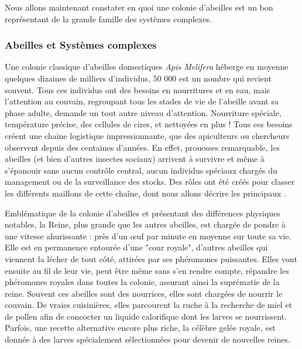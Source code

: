 			Nous allons maintenant constater en quoi une colonie d'abeilles est un bon représentant de la grande famille des systèmes complexes.
			
			

	
		\subsubsection{Abeilles et Systèmes complexes}		
			Une colonie classique d'abeilles domestiques \textit{Apis Melifera} héberge en moyenne quelques dizaines de milliers d'individus, 50 000 est un nombre qui revient souvent. Tous ces individus ont des besoins en nourritures et en eau, mais l'attention au couvain, regroupant tous les stades de vie de l'abeille avant sa phase adulte, demande un tout autre niveau d'attention. Nourriture spéciale, température précise, des cellules de cires, et nettoyées en plus ! Tous ces besoins créent une chaine logistique impressionnante, que des apiculteurs ou chercheurs observent depuis des centaines d'années. En effet, prouesses remarquable, les abeilles (et bien d'autres insectes sociaux) arrivent à survivre et même à s'épanouir sans aucun contrôle central, aucun individus spéciaux chargés du management ou de la surveillance des stocks. Des rôles ont été créés pour classer les différents maillons de cette chaîne, dont nous allons décrire les principaux \cite{winston_biology_1991, winston_role_1991, seeley_age_1991}. 
			
			Emblématique de la colonie d'abeilles et présentant des différences physiques notables, la Reine, plus grande que les autres abeilles, est chargée de pondre à une vitesse ahurissante : près d'un œuf par minute en moyenne sur toute sa vie. Elle est en permanence entourée d'une "cour royale", d'autres abeilles qui viennent la lécher de tout côté, attirées par ses phéromones puissantes. Elles vont ensuite au fil de leur vie, peut être même sans s'en rendre compte, répandre les phéromones royales dans toutes la colonie, assurant ainsi la suprématie de la reine. Souvent ces abeilles sont des nourrices, elles sont chargées de nourrir le couvain. De vraies cuisinières, elles parcourent la ruche à la recherche de miel et de pollen afin de concocter un liquide calorifique dont les larves se nourrissent. Parfois, une recette alternative encore plus riche, la célèbre gelée royale, est donnée à des larves spécialement sélectionnées pour devenir de nouvelles reines.
			
